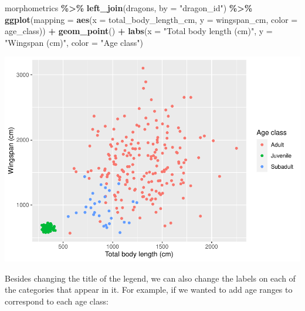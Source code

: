 \documentclass[
]{book}
\newenvironment{Shaded}{\begin{snugshade}}{\end{snugshade}}
\newcommand{\AttributeTok}[1]{\textcolor[rgb]{0.13,0.29,0.53}{#1}}
\newcommand{\FunctionTok}[1]{\textcolor[rgb]{0.13,0.29,0.53}{\textbf{#1}}}
\newcommand{\NormalTok}[1]{#1}
\newcommand{\SpecialCharTok}[1]{\textcolor[rgb]{0.81,0.36,0.00}{\textbf{#1}}}
\newcommand{\StringTok}[1]{\textcolor[rgb]{0.31,0.60,0.02}{#1}}
\begin{document}
\begin{Shaded}
\begin{Highlighting}[]
\NormalTok{morphometrics }\SpecialCharTok{\%\textgreater{}\%} 
  \FunctionTok{left\_join}\NormalTok{(dragons, }\AttributeTok{by =} \StringTok{"dragon\_id"}\NormalTok{) }\SpecialCharTok{\%\textgreater{}\%} 
\FunctionTok{ggplot}\NormalTok{(}\AttributeTok{mapping =} \FunctionTok{aes}\NormalTok{(}\AttributeTok{x =}\NormalTok{ total\_body\_length\_cm, }\AttributeTok{y =}\NormalTok{ wingspan\_cm, }\AttributeTok{color =}\NormalTok{ age\_class)) }\SpecialCharTok{+}
  \FunctionTok{geom\_point}\NormalTok{() }\SpecialCharTok{+}
  \FunctionTok{labs}\NormalTok{(}\AttributeTok{x =} \StringTok{"Total body length (cm)"}\NormalTok{, }\AttributeTok{y =} \StringTok{"Wingspan (cm)"}\NormalTok{, }\AttributeTok{color =} \StringTok{"Age class"}\NormalTok{)}
\end{Highlighting}
\end{Shaded}

\includegraphics{reproducible-science_files/figure-latex/gg9-1.pdf}

Besides changing the title of the legend, we can also change the labels on each
of the categories that appear in it. For example, if we wanted to add age
ranges to correspond to each age class:
\end{document}
